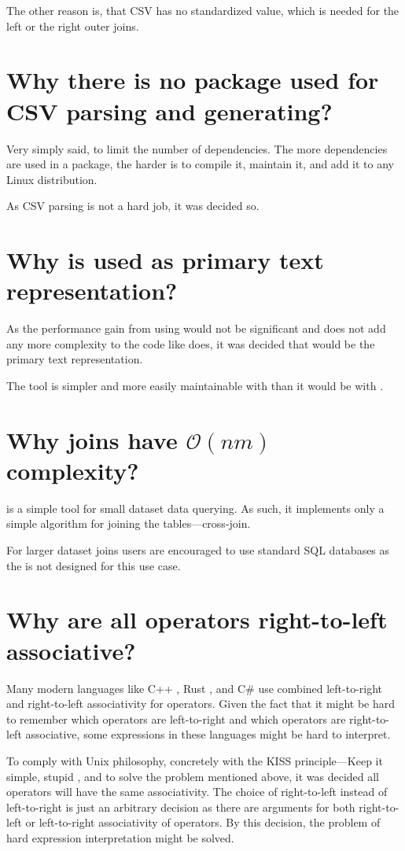 The other reason is, that CSV has no standardized  value, which is needed for the left or the right outer joins.

\section{Why there is no package used for CSV parsing and generating?}
Very simply said, to limit the number of dependencies. The more dependencies are used in a package, the harder is to compile it, maintain it, and add it to any Linux distribution.

As CSV parsing is not a hard job, it was decided so.

\section{Why  is used as primary text representation?}
As the performance gain from using  would not be significant and  does not add any more complexity to the code like  does, 
it was decided that  would be the primary text representation.

The tool is simpler and more easily maintainable with  than it would be with .

\section{Why joins have $\mathcal{O}(nm)$ complexity?}
 is a simple tool for small dataset data querying. As such, it implements only a simple algorithm for joining the tables---cross-join.

For larger dataset joins users are encouraged to use standard SQL databases as the  is not designed for this use case.

\section{Why are all operators right-to-left associative?}
Many modern languages like C++ \cite{cpp-associativity-manual}, Rust \cite{rust-expressions}, and C\# \cite{csharp-expressions} use combined left-to-right and right-to-left associativity for operators.
Given the fact that it might be hard to remember which operators are left-to-right and which operators are right-to-left associative, some expressions in these languages might be hard to interpret.

To comply with Unix philosophy, concretely with the KISS principle---Keep it simple, stupid \cite{enwiki-kiss}, and to solve the problem mentioned above, it was decided all operators will have the same associativity.
The choice of right-to-left instead of left-to-right is just an arbitrary decision as there are arguments for both right-to-left or left-to-right associativity of operators.
By this decision, the problem of hard expression interpretation might be solved.
